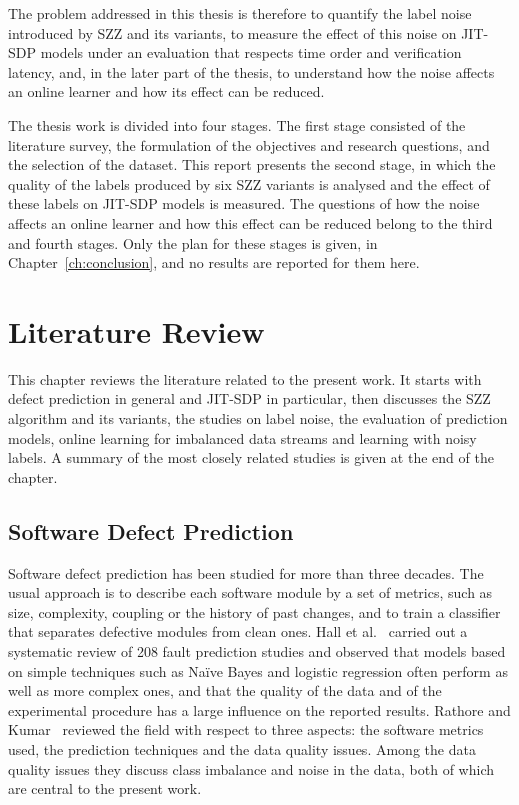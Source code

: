 \documentclass[12pt,a4paper,oneside]{report}
\begin{document}
The problem addressed in this thesis is therefore to quantify the label noise
introduced by SZZ and its variants, to measure the effect of this noise on
JIT-SDP models under an evaluation that respects time order and verification
latency, and, in the later part of the thesis, to understand how the noise
affects an online learner and how its effect can be reduced.

The thesis work is divided into four stages. The first stage consisted of the
literature survey, the formulation of the objectives and research questions,
and the selection of the dataset. This report presents the second stage, in
which the quality of the labels produced by six SZZ variants is analysed and
the effect of these labels on JIT-SDP models is measured. The questions of
how the noise affects an online learner and how this effect can be reduced
belong to the third and fourth stages. Only the plan for these stages is
given, in Chapter~\ref{ch:conclusion}, and no results are reported for them
here.

\chapter{Literature Review}\label{ch:lit}

This chapter reviews the literature related to the present work. It starts
with defect prediction in general and JIT-SDP in particular, then discusses
the SZZ algorithm and its variants, the studies on label noise, the evaluation
of prediction models, online learning for imbalanced data streams and learning
with noisy labels. A summary of the most closely related studies is given at
the end of the chapter.

\section{Software Defect Prediction}

Software defect prediction has been studied for more than three decades. The
usual approach is to describe each software module by a set of metrics, such
as size, complexity, coupling or the history of past changes, and to train a
classifier that separates defective modules from clean ones. Hall et
al.~\cite{hall2012slr} carried out a systematic review of 208 fault prediction
studies and observed that models based on simple techniques such as Na\"ive
Bayes and logistic regression often perform as well as more complex ones, and
that the quality of the data and of the experimental procedure has a large
influence on the reported results. Rathore and Kumar~\cite{rathore2019study}
reviewed the field with respect to three aspects: the software metrics used,
the prediction techniques and the data quality issues. Among the data quality
issues they discuss class imbalance and noise in the data, both of which are
central to the present work.
\end{document}
